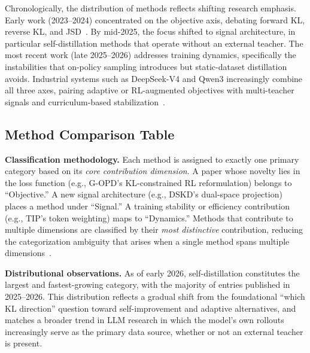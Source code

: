 \documentclass{article} %
\begin{document}
Chronologically, the distribution of methods reflects shifting research emphasis. Early work (2023--2024) concentrated on the objective axis, debating forward KL, reverse KL, and JSD~\citep{2306.13649,2306.08543}. By mid-2025, the focus shifted to signal architecture, in particular self-distillation methods that operate without an external teacher. The most recent work (late 2025--2026) addresses training dynamics, specifically the instabilities that on-policy sampling introduces but static-dataset distillation avoids. Industrial systems such as DeepSeek-V4 and Qwen3 increasingly combine all three axes, pairing adaptive or RL-augmented objectives with multi-teacher signals and curriculum-based stabilization~\citep{2602.12125,2505.09388}.

\subsection{Method Comparison Table}

\textbf{Classification methodology.} Each method is assigned to exactly one primary category based on its \emph{core contribution dimension}. A paper whose novelty lies in the loss function (e.g., G-OPD's KL-constrained RL reformulation) belongs to ``Objective.'' A new signal architecture (e.g., DSKD's dual-space projection) places a method under ``Signal.'' A training stability or efficiency contribution (e.g., TIP's token weighting) maps to ``Dynamics.'' Methods that contribute to multiple dimensions are classified by their \emph{most distinctive} contribution, reducing the categorization ambiguity that arises when a single method spans multiple dimensions~\citep{2402.13116}.

\textbf{Distributional observations.} As of early 2026, self-distillation constitutes the largest and fastest-growing category, with the majority of entries published in 2025--2026. This distribution reflects a gradual shift from the foundational ``which KL direction'' question toward self-improvement and adaptive alternatives, and matches a broader trend in LLM research in which the model's own rollouts increasingly serve as the primary data source, whether or not an external teacher is present.
\end{document}
